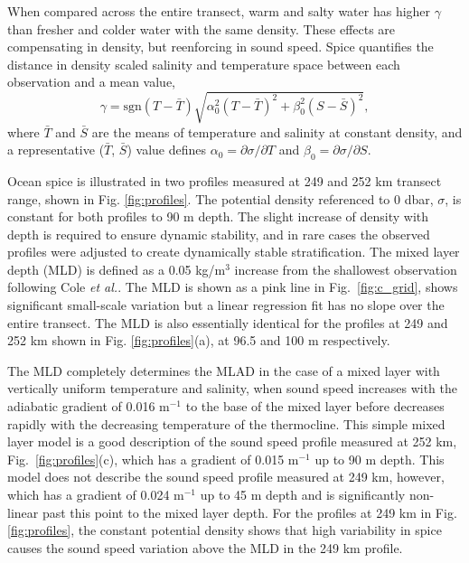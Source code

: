 \documentclass[preprint,NumberedRefs]{JASA}
\begin{document}
When compared across the entire transect, warm and salty water has higher $\gamma$ than fresher and colder water with the same density. These effects are compensating in density, but reenforcing in sound speed. Spice quantifies the distance in density scaled salinity and temperature space between each observation and a mean value,
\begin{equation}
    \gamma=\textrm{sgn}(T-\bar{T}) \sqrt{\alpha_0^2(T-\bar{T})^2 +\beta_0^2(S-\bar{S})^2},
    \label{eq:gamma}
\end{equation}
where $\bar{T}$ and $\bar{S}$ are the means of temperature and salinity at constant density, and a representative ($\bar{T}$, $\bar{S}$) value defines $\alpha_0=\partial \sigma / \partial T$ and $\beta_0=\partial \sigma / \partial S$.

Ocean spice is illustrated in two profiles measured at 249 and 252 km transect range, shown in Fig. \ref{fig:profiles}. The potential density referenced to 0 dbar, $\sigma$, is constant for both profiles to 90 m depth. The slight increase of density with depth is required to ensure dynamic stability, and in rare cases the observed profiles were adjusted to create dynamically stable stratification\citep{barker2017stabilizing}. The mixed layer depth (MLD) is defined as a 0.05 kg/m$^3$ increase from the shallowest observation following Cole \emph{et al.}\cite{cole2010seasonal}. The MLD is shown as a pink line in Fig.~\ref{fig:c_grid}, shows significant small-scale variation but a linear regression fit has no slope over the entire transect. The MLD is also essentially identical for the profiles at 249 and 252 km shown in Fig. \ref{fig:profiles}(a), at 96.5 and 100 m respectively.

The MLD completely determines the MLAD in the case of a mixed layer with vertically uniform temperature and salinity, when sound speed increases with the adiabatic gradient of 0.016 m$^{-1}$ to the base of the mixed layer before decreases rapidly with the decreasing temperature of the thermocline. This simple mixed layer model is a good description of the sound speed profile measured at 252 km, Fig.~\ref{fig:profiles}(c), which has a gradient of 0.015 m$^{-1}$ up to 90 m depth. This model does not describe the sound speed profile measured at 249 km, however, which has a gradient of 0.024 m$^{-1}$ up to 45 m depth and is significantly non-linear past this point to the mixed layer depth. For the profiles at 249 km in Fig. \ref{fig:profiles}, the constant potential density shows that high variability in spice causes the sound speed variation above the MLD in the 249 km profile.
\end{document}
